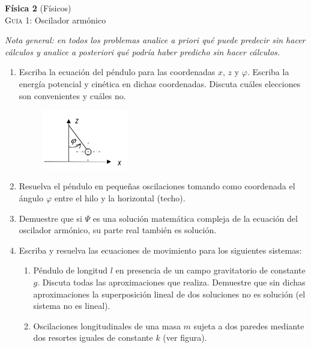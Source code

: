\documentclass[11pt,spanish,a4paper]{article}
\begin{document}
\begin{center}
  \textbf{Física 2} (Físicos) \hfill {}\\
  \textsc{\large Guía 1:} Oscilador armónico
\end{center}
\centering
\emph{Nota general: en todos los problemas analice a priori qué puede predecir sin
	hacer cálculos y analice a posteriori qué podría haber predicho sin hacer
cálculos.}


\begin{enumerate}


\item Escriba la ecuación del péndulo para las coordenadas \(x\), \(z\) y \(\varphi\).
	Escriba la energía potencial y cinética en dichas coordenadas.
	Discuta cuáles elecciones son convenientes y cuáles no.
	\begin{figure}[h]
		\centering{}\includegraphics[width=0.35\textwidth]{guia1_e1}
	\end{figure}


\item Resuelva el péndulo en pequeñas oscilaciones tomando como coordenada el
	ángulo \(\varphi\) entre el hilo y la horizontal (techo).


\item Demuestre que si \(\Psi\) es una solución matemática compleja de la ecuación del oscilador armónico, su parte real también es solución.


\item Escriba y resuelva las ecuaciones de movimiento para los siguientes sistemas:
	\begin{enumerate}
		\item Péndulo de longitud \(l\) en presencia de un campo gravitatorio de constante \(g\).
			Discuta todas las aproximaciones que realiza.
			Demuestre que sin dichas aproximaciones la superposición lineal de dos soluciones no es solución (el sistema no es lineal).

		\item Oscilaciones longitudinales de una masa \(m\) sujeta a dos paredes mediante dos resortes iguales de constante \(k\) (ver figura).%


\end{enumerate}
\end{enumerate}
\end{document}
